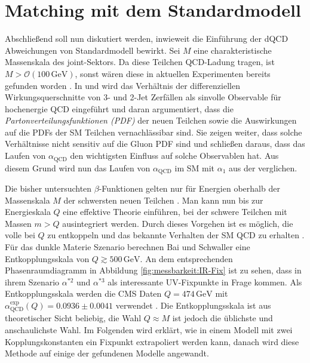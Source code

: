 \clearpage
\section{Matching mit dem Standardmodell}

  Abschließend soll nun diskutiert werden, inwieweit die Einführung der dQCD 
  Abweichungen von Standardmodell bewirkt. Sei $M$ eine charakteristische 
  Massenskala des joint-Sektors. Da diese Teilchen QCD-Ladung tragen, ist 
  $M > \mathcal{O}(100\,\text{GeV})$, sonst wären diese in aktuellen 
  Experimenten bereits gefunden worden 
  \cite{Scale_of_dark_QCD}\cite{Becciolini:2014lya}. In 
  \cite{Becciolini:2014lya} und \cite{Sannino} wird das Verhältnis 
  der differenziellen Wirkungsquerschnitte von 3- und 2-Jet Zerfällen als 
  sinvolle Observable für hochenergie QCD eingeführt
  und daran argumentiert, dass 
  die \textit{Partonverteilungsfunktionen (PDF)} der neuen Teilchen sowie die 
  Auswirkungen auf die PDFs der SM Teilchen vernachlässibar sind. Sie zeigen 
  weiter, dass solche Verhältnisse nicht sensitiv auf die Gluon PDF sind und 
  schließen daraus, dass das Laufen von $\alpha_\text{QCD}$ den wichtigsten 
  Einfluss auf solche Observablen hat. Aus diesem Grund wird nun das Laufen 
  von $\alpha_\text{QCD}$ im SM mit $\alpha_1$ aus der \QCDxdQCD verglichen. 
  
  Die bisher untersuchten $\beta$-Funktionen gelten nur für Energien oberhalb 
  der Massenskala $M$ der schwersten neuen Teilchen \cite{Becciolini:2014lya}. 
  Man kann nun bis zur Energieskala $Q$ eine effektive Theorie einführen, bei 
  der schwere Teilchen mit Massen $m > Q$ ausintegriert werden. 
  Durch dieses Vorgehen ist es möglich, die volle \QCDxdQCD bei $Q$ zu 
  entkoppeln und das bekannte Verhalten der SM QCD zu erhalten 
  \cite{Bednyakov2015262}. Für das dunkle Materie Szenario berechnen Bai und 
  Schwaller eine Entkopplungsskala von $Q \gtrsim 500\,\text{GeV}$. An dem 
  entsprechenden Phasenraumdiagramm in Abbildung \ref{fig:messbarkeit:IR-Fix}
  ist zu sehen, dass in ihrem Szenario $\alpha^{*2}$ und $\alpha^{*3}$ als 
  interessante UV-Fixpunkte in Frage kommen. Als Entkopplungsskala werden die 
  CMS Daten $Q=474\,\text{GeV}$ mit 
  $\alpha_\text{QCD}^\text{exp}(Q)=0.0936 \pm 0.0041$ verwendet
  \cite{Chatrchyan:2013txa}. Die Entkopplungsskala ist aus theoretischer Sicht 
  beliebig, die Wahl $ Q \approx M$ ist jedoch die üblichste und anschaulichste
  Wahl. Im Folgenden 
  wird erklärt, wie in einem Modell mit zwei Kopplungskonstanten ein Fixpunkt 
  extrapoliert werden kann, danach wird diese Methode auf einige der gefundenen 
  Modelle angewandt.
  
  

